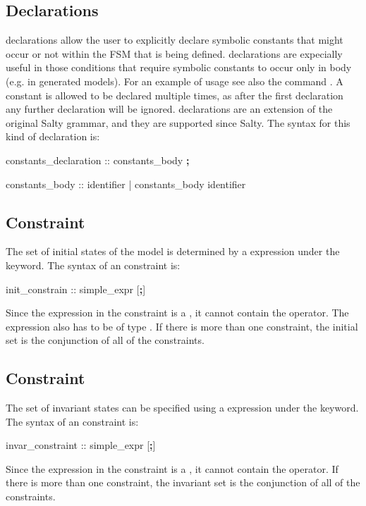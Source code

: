 \subsection{ Declarations}
\label{CONSTANTS Declarations}
%
 declarations allow the user to explicitly 
declare symbolic constants that might occur or not within the FSM that
is being defined. 
%
 declarations are expecially useful 
in those conditions that require symbolic constants to occur only
in  body (e.g. in generated models).
For an example of usage see also the command .
%
A constant is allowed to be declared multiple times, as after the
first declaration any further declaration will be ignored.
%
 declarations are an extension of the original 
Salty grammar, and they are supported since Salty.
%
The syntax for this kind of declaration is:
%
\begin{Grammar}
constants_declaration ::  constants_body \textbf{;}

constants_body :: identifier 
             | constants_body  \operator{,} identifier
\end{Grammar}


\subsection{ Constraint}
\label{INIT Constraint}
%
The set of initial states of the model is determined by a \Boolean
expression under the  keyword.
%
The syntax of an  constraint is:
%
\begin{Grammar}
init_constrain ::  simple_expr [\textbf{;}]
\end{Grammar}
%
Since the expression in the  constraint is a
, it cannot contain the 
operator.
%
The expression also has to be of type \Boolean.
%
If there is more than one  constraint, the initial set is
the conjunction of all of the  constraints.

\subsection{ Constraint}
\label{INVAR Constraint}
%
The set of invariant states can be specified using a \Boolean
expression under the  keyword.
%
The syntax of an  constraint is:
%
\begin{Grammar}
invar_constraint ::  simple_expr [\textbf{;}]
\end{Grammar}
%
Since the expression in the  constraint is a
, it cannot contain the 
operator. 
%
If there is more than one  constraint, the invariant set
is the conjunction of all of the  constraints.

